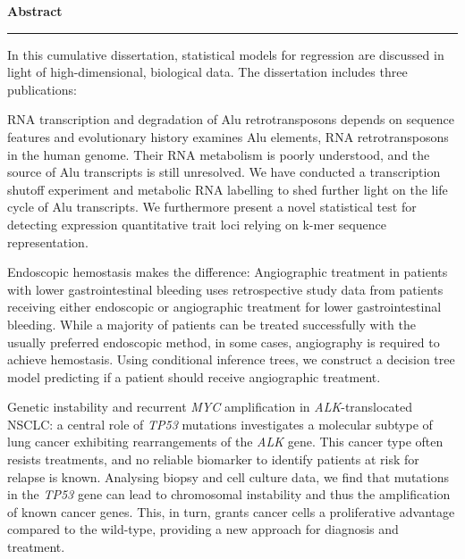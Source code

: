 

\null
\vspace{\dimexpr2.3\baselineskip+1\parskip\relax}

\begingroup
  \fontsize{22}{26.4}\color{s-blue}\sffamily\bfseries
  \noindent\raggedleft Abstract\par
  \vspace*{-.5\baselineskip}
  \noindent\rule{\textwidth}{.5pt}\par\nobreak
\endgroup
\vspace{\baselineskip}

\noindent In this cumulative dissertation, statistical models for regression
are discussed in light of high-dimensional, biological data. The dissertation
includes three publications:
\medbreak

\noindent\textcolor{s-base01}{RNA transcription and degradation of Alu
retrotransposons depends on sequence features and evolutionary history}
examines Alu elements, RNA retrotransposons in the human genome. Their RNA
metabolism is poorly understood, and the source of Alu transcripts is still
unresolved. We have conducted a transcription shutoff experiment and metabolic
RNA labelling to shed further light on the life cycle of Alu transcripts. We
furthermore present a novel statistical test for detecting expression
quantitative trait loci relying on k-mer sequence representation.
\medbreak

\noindent\textcolor{s-base01}{Endoscopic hemostasis makes the difference:
Angiographic treatment in patients with lower gastrointestinal bleeding} uses
retrospective study data from patients receiving either endoscopic or
angiographic treatment for lower gastrointestinal bleeding. While a majority
of patients can be treated successfully with the usually preferred endoscopic
method, in some cases, angiography is required to achieve hemostasis. Using
conditional inference trees, we construct a decision tree model predicting if
a patient should receive angiographic treatment.
\medbreak

\noindent\textcolor{s-base01}{Genetic instability and recurrent \textit{MYC}
amplification in \textit{ALK}-translocated NSCLC: a central role of
\textit{TP53} mutations} investigates a molecular subtype of lung cancer
exhibiting rearrangements of the \textit{ALK} gene. This cancer type often
resists treatments, and no reliable biomarker to identify patients at risk for
relapse is known. Analysing biopsy and cell culture data, we find that
mutations in the \textit{TP53} gene can lead to chromosomal instability and
thus the amplification of known cancer genes. This, in turn, grants cancer
cells a proliferative advantage compared to the wild-type, providing a new
approach for diagnosis and treatment.